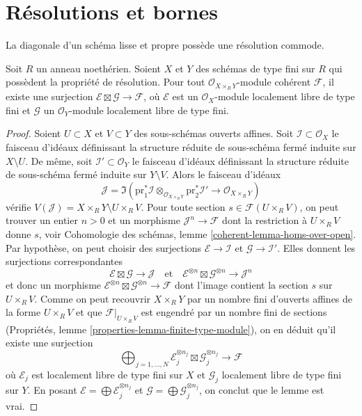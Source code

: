 \section{Résolutions et bornes}
\label{section-tricks-smooth}

\noindent
La diagonale d'un schéma lisse et propre possède une résolution commode.

\begin{lemma}
\label{lemma-on-product}
Soit $R$ un anneau noethérien. Soient $X$ et $Y$ des schémas de type fini sur $R$
qui possèdent la propriété de résolution. Pour tout
$\mathcal{O}_{X \times_R Y}$-module cohérent $\mathcal{F}$, il existe
une surjection $\mathcal{E} \boxtimes \mathcal{G} \to \mathcal{F}$,
où $\mathcal{E}$ est un $\mathcal{O}_X$-module localement libre de type fini
et $\mathcal{G}$ un $\mathcal{O}_Y$-module localement libre de type fini.
\end{lemma}

\begin{proof}
Soient $U \subset X$ et $V \subset Y$ des sous-schémas ouverts affines. Soit
$\mathcal{I} \subset \mathcal{O}_X$ le faisceau d'idéaux définissant la
structure réduite de sous-schéma fermé induite sur $X \setminus U$.
De même, soit $\mathcal{I}' \subset \mathcal{O}_Y$ le faisceau d'idéaux définissant la
structure réduite de sous-schéma fermé induite sur $Y \setminus V$.
Alors le faisceau d'idéaux
$$
\mathcal{J} = \Im(\text{pr}_1^*\mathcal{I} \otimes_{\mathcal{O}_{X \times_R Y}}
\text{pr}_2^*\mathcal{I}' \to \mathcal{O}_{X \times_R Y})
$$
vérifie $V(\mathcal{J}) = X \times_R Y \setminus U \times_R V$.
Pour toute section $s \in \mathcal{F}(U \times_R V)$, on peut trouver un entier
$n > 0$ et un morphisme $\mathcal{J}^n \to \mathcal{F}$ dont la restriction à
$U \times_R V$ donne $s$, voir
Cohomologie des schémas, lemme \ref{coherent-lemma-homs-over-open}.
Par hypothèse, on peut choisir des surjections
$\mathcal{E} \to \mathcal{I}$ et $\mathcal{G} \to \mathcal{I}'$.
Elles donnent les surjections correspondantes
$$
\mathcal{E} \boxtimes \mathcal{G} \to \mathcal{J}
\quad\text{et}\quad
\mathcal{E}^{\otimes n} \boxtimes \mathcal{G}^{\otimes n} \to \mathcal{J}^n
$$
et donc un morphisme
$\mathcal{E}^{\otimes n} \boxtimes \mathcal{G}^{\otimes n} \to \mathcal{F}$
dont l'image contient la section $s$ sur $U \times_R V$.
Comme on peut recouvrir $X \times_R Y$ par un nombre fini d'ouverts affines
de la forme $U \times_R V$ et que $\mathcal{F}|_{U \times_R V}$
est engendré par un nombre fini de sections (Propriétés, lemme
\ref{properties-lemma-finite-type-module}),
on en déduit qu'il existe une surjection
$$
\bigoplus\nolimits_{j = 1, \ldots, N}
\mathcal{E}_j^{\otimes n_j} \boxtimes \mathcal{G}_j^{\otimes n_j}
\to \mathcal{F}
$$
où $\mathcal{E}_j$ est localement libre de type fini sur $X$ et
$\mathcal{G}_j$ localement libre de type fini sur $Y$.
En posant $\mathcal{E} = \bigoplus \mathcal{E}_j^{\otimes n_j}$
et $\mathcal{G} = \bigoplus \mathcal{G}_j^{\otimes n_j}$,
on conclut que le lemme est vrai.
\end{proof}

